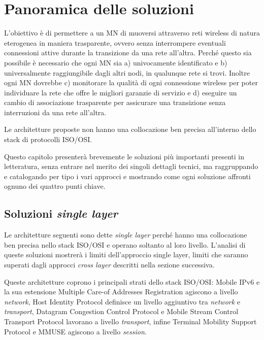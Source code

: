 \documentclass[12pt,a4paper,openright,twoside]{book}
\begin{document}
\clearpage{\pagestyle{empty}\cleardoublepage}

\chapter{Panoramica delle soluzioni}
\lhead[\fancyplain{}{\bfseries\thepage}]{\fancyplain{}{\bfseries\rightmark}}
L'obiettivo è di permettere a un MN di muoversi attraverso reti
wireless di natura eterogenea in maniera trasparente, ovvero senza
interrompere eventuali connessioni attive durante la transizione da
una rete all'altra. Perché questo sia possibile è necessario che ogni
MN sia a) univocamente identificato e b) universalmente raggiungibile
dagli altri nodi, in qualunque rete si trovi. Inoltre ogni MN dovrebbe
c) monitorare la qualità di ogni connessione wireless per poter
individuare la rete che offre le migliori garanzie di servizio e d)
eseguire un cambio di associazione trasparente per assicurare una
transizione senza interruzioni da una rete all'altra.

Le architetture proposte non hanno una collocazione ben precisa
all'interno dello stack di protocolli ISO/OSI.

Questo capitolo presenterà brevemente le soluzioni più importanti
presenti in letteratura, senza entrare nel merito dei singoli dettagli
tecnici, ma raggruppando e catalogando per tipo i vari approcci e
mostrando come ogni soluzione affronti ognuno dei quattro punti
chiave.

\section{Soluzioni \emph{single layer}}
Le architetture seguenti sono dette \emph{single layer} perché hanno
una collocazione ben precisa nello stack ISO/OSI e operano soltanto al
loro livello. L'analisi di queste soluzioni mostrerà i limiti
dell'approccio single layer, limiti che saranno superati dagli
approcci \emph{cross layer} descritti nella sezione successiva.

Queste architetture coprono i principali strati dello stack ISO/OSI:
Mobile IPv6 \cite{bib:mipv6} e la sua estensione Multiple Care-of
Addresses Registration \cite{bib:mcoa} agiscono a livello
\emph{network}, Host Identity Protocol \cite{bib:hip} definisce un
livello aggiuntivo tra \emph{network} e \emph{transport}, Datagram
Congestion Control Protocol \cite{bib:dccp} e Mobile Stream Control
Transport Protocol \cite{bib:m-sctp} lavorano a livello
\emph{transport}, infine Terminal Mobility Support Protocol
\cite{bib:tmsp} e MMUSE \cite{bib:mmuse} agiscono a livello
\emph{session}.
\end{document}
